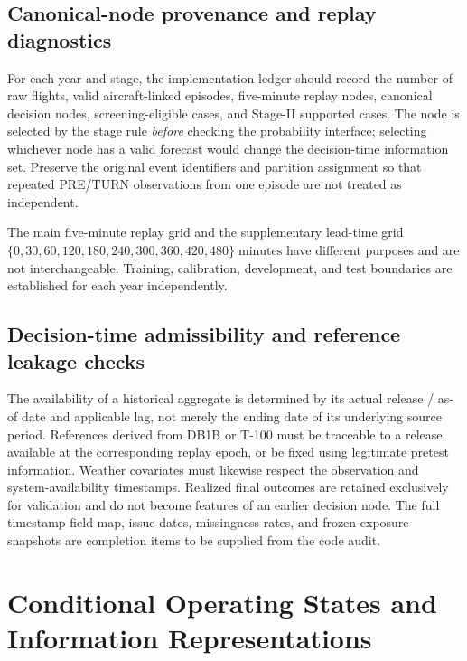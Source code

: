 \documentclass[10pt,a4paper]{article}
\numberwithin{equation}{section}
\begin{document}
\subsection{Canonical-node provenance and replay diagnostics}
For each year and stage, the implementation ledger should record the number of raw flights, valid aircraft-linked episodes, five-minute replay nodes, canonical decision nodes, screening-eligible cases, and Stage-II supported cases. The node is selected by the stage rule \emph{before}
checking the probability interface; selecting whichever node has a valid forecast would change the decision-time information set. Preserve the original event identifiers and partition assignment so that repeated PRE/TURN observations from one episode are not treated as independent.

The main five-minute replay grid and the supplementary lead-time grid \(\{0,30,60,120,180,240,300,360,420,480\}\;\text{minutes}\) have different purposes and are not interchangeable. Training, calibration, development, and test boundaries are established for each year independently.

\subsection{Decision-time admissibility and reference leakage checks}
The availability of a historical aggregate is determined by its actual release / as-of date and applicable lag, not merely the ending date of its underlying source period. References derived from DB1B or T-100 must be traceable to a release available at the corresponding replay epoch, or be fixed using legitimate pretest information. Weather covariates must likewise respect the observation and system-availability timestamps. Realized final outcomes are retained exclusively for validation and do not become features of an earlier decision node. The full timestamp field map, issue dates, missingness rates, and frozen-exposure snapshots are completion items to be supplied from the code audit.


\section{Conditional Operating States and Information Representations}
\label{sup:states}
\end{document}
